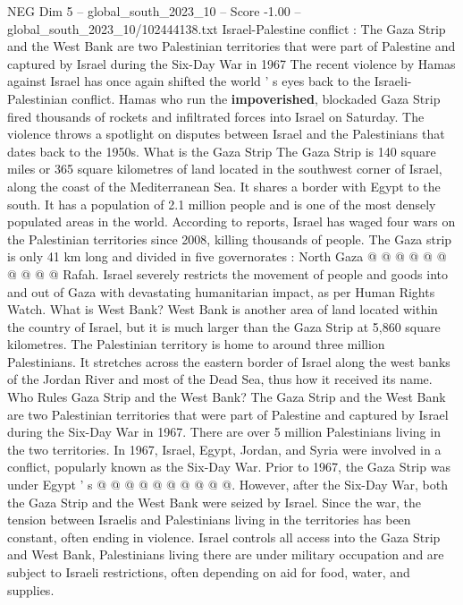 \begin{textsample}{NEG Dim 5 – global\_south\_2023\_10 – Score -1.00 – global\_south\_2023\_10/102444138.txt}  \label{ex:f5_neg_098}
Israel-Palestine conflict : The Gaza Strip and the West Bank are two Palestinian territories that were part of Palestine and captured by Israel during the Six-Day War in 1967 The recent violence by Hamas against Israel has once again shifted the world ' s eyes back to the Israeli-Palestinian conflict.
Hamas who run the \textbf{impoverished}, blockaded Gaza Strip fired thousands of rockets and infiltrated forces into Israel on Saturday.
The violence throws a spotlight on disputes between Israel and the Palestinians that dates back to the 1950s.
What is the Gaza Strip The Gaza Strip is 140 square miles or 365 square kilometres of land located in the southwest corner of Israel, along the coast of the Mediterranean Sea.
It shares a border with Egypt to the south.
It has a population of 2.1 million people and is one of the most densely populated areas in the world.
According to reports, Israel has waged four wars on the Palestinian territories since 2008, killing thousands of people.
The Gaza strip is only 41 km long and divided in five governorates : North Gaza @ @ @ @ @ @ @ @ @ @ Rafah.
Israel severely restricts the movement of people and goods into and out of Gaza with devastating humanitarian impact, as per Human Rights Watch.
What is West Bank?
West Bank is another area of land located within the country of Israel, but it is much larger than the Gaza Strip at 5,860 square kilometres.
The Palestinian territory is home to around three million Palestinians.
It stretches across the eastern border of Israel along the west banks of the Jordan River and most of the Dead Sea, thus how it received its name.
Who Rules Gaza Strip and the West Bank?
The Gaza Strip and the West Bank are two Palestinian territories that were part of Palestine and captured by Israel during the Six-Day War in 1967.
There are over 5 million Palestinians living in the two territories.
In 1967, Israel, Egypt, Jordan, and Syria were involved in a conflict, popularly known as the Six-Day War.
Prior to 1967, the Gaza Strip was under Egypt ' s @ @ @ @ @ @ @ @ @ @.
However, after the Six-Day War, both the Gaza Strip and the West Bank were seized by Israel.
Since the war, the tension between Israelis and Palestinians living in the territories has been constant, often ending in violence.
Israel controls all access into the Gaza Strip and West Bank, Palestinians living there are under military occupation and are subject to Israeli restrictions, often depending on aid for food, water, and supplies.

\end{textsample}
